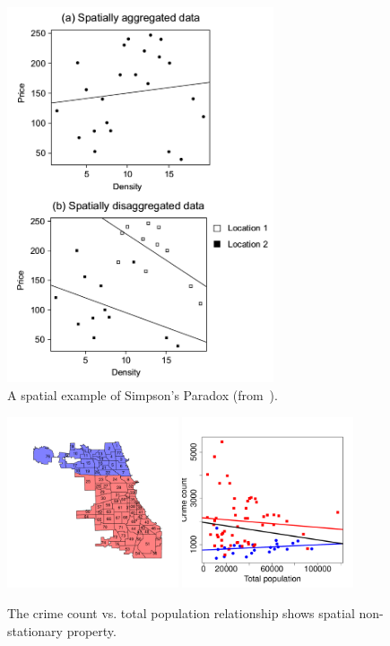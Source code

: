 \begin{figure}[h]
\centering
\includegraphics[width=0.7\textwidth]{fig/simpson.png}
\caption{A spatial example of Simpson's Paradox (from~\cite{GWR03}).}
\label{fig:simpson}
\end{figure}

\begin{figure}[h]
\centering
\includegraphics[width=0.45\textwidth]{fig/north-south-split.pdf}
\includegraphics[width=0.45\textwidth]{fig/crime-pop.pdf}
\caption{The crime count vs. total population relationship shows spatial non-stationary property.}
\label{fig:spa-non-sta}
\end{figure}


